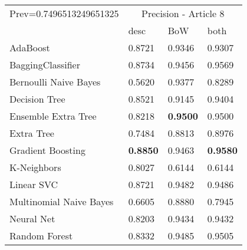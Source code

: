\begin{tabular}{|l|l|l|l| }
\hline
Prev=0.7496513249651325 &  \multicolumn{3}{c|}{Precision - Article 8} \\
\cline{2-4} & desc & BoW & both \\ \hline
AdaBoost                & 0.8721 & 0.9346 & 0.9307\\
BaggingClassifier       & 0.8734 & 0.9456 & 0.9569\\
Bernoulli Naive Bayes   & 0.5620 & 0.9377 & 0.8289\\
Decision Tree           & 0.8521 & 0.9145 & 0.9404\\
Ensemble Extra Tree     & 0.8218 & {\bf 0.9500} & 0.9500\\
Extra Tree              & 0.7484 & 0.8813 & 0.8976\\
Gradient Boosting       & {\bf 0.8850} & 0.9463 & {\bf 0.9580}\\
K-Neighbors             & 0.8027 & 0.6144 & 0.6144\\
Linear SVC              & 0.8721 & 0.9482 & 0.9486\\
Multinomial Naive Bayes & 0.6605 & 0.8880 & 0.7945\\
Neural Net              & 0.8203 & 0.9434 & 0.9432\\
Random Forest           & 0.8332 & 0.9485 & 0.9505\\
\hline
\end{tabular}